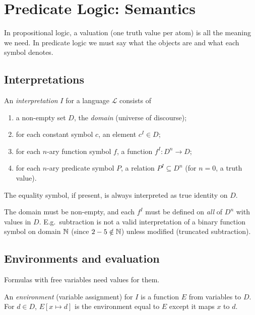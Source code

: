 \chapter{Predicate Logic: Semantics}\label{ch:predsem}

In propositional logic, a valuation (one truth value per atom) is all the meaning we need.
In predicate logic we must say what the objects are and what each symbol denotes.

\section{Interpretations}

\begin{definition}
An \emph{interpretation} $I$ for a language $\mathcal{L}$ consists of
\begin{enumerate}
  \item a non-empty set $D$, the \emph{domain} (universe of discourse);
  \item for each constant symbol $c$, an element $c^I\in D$;
  \item for each $n$-ary function symbol $f$, a function $f^I: D^n\to D$;
  \item for each $n$-ary predicate symbol $P$, a relation $P^I\subseteq D^n$
        (for $n=0$, a truth value).
\end{enumerate}
The equality symbol, if present, is always interpreted as true identity on $D$.
\end{definition}

\begin{important}
The domain must be non-empty, and each $f^I$ must be defined on \emph{all} of $D^n$ with
values in $D$. E.g.\ subtraction is not a valid interpretation of a binary function
symbol on domain $\mathbb{N}$ (since $2-5\notin\mathbb{N}$) unless modified (truncated subtraction).
\end{important}

\section{Environments and evaluation}

Formulas with free variables need values for them.

\begin{definition}[Environment]
An \emph{environment} (variable assignment) for $I$ is a function $E$ from variables to
$D$. For $d\in D$, $E[x\mapsto d]$ is the environment equal to $E$ except it maps $x$
to $d$.
\end{definition}

